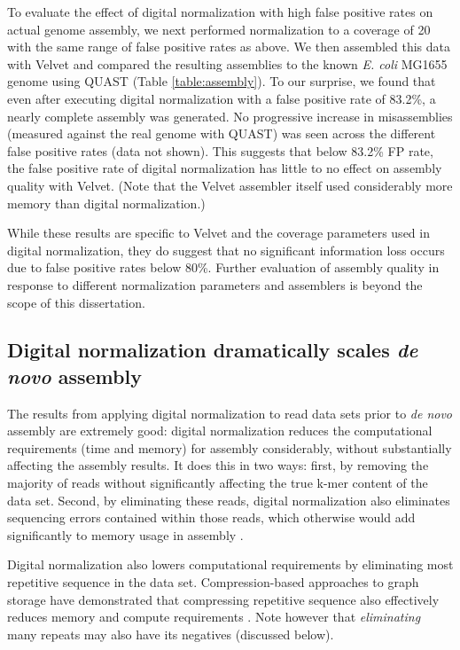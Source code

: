 To evaluate the effect of digital normalization with high false positive rates
on actual genome assembly, we next performed normalization to a coverage of 20
with the same range of false positive rates as above.  We then assembled this
data with Velvet \cite{Zerbino2008} and compared the resulting assemblies to
the known {\em E. coli} MG1655 genome using QUAST \cite{Gurevich2013} (Table \ref{table:assembly}).
To our surprise, we found that even after executing digital normalization with
a false positive rate of 83.2\%, a nearly complete assembly was generated.  No
progressive increase in misassemblies (measured against the real genome with
QUAST) was seen across the different false positive rates (data not shown).
This suggests that below 83.2\% FP rate, the false positive rate of digital
normalization has little to no effect on assembly quality with Velvet.  (Note
that the Velvet assembler itself used considerably more memory than digital
normalization.)


While these results are specific to Velvet and the coverage parameters used in
digital normalization, they do suggest that no significant information loss
occurs due to false positive rates below 80\%. Further evaluation of assembly
quality in response to different normalization parameters and assemblers is
beyond the scope of this dissertation.


\subsection{Digital normalization dramatically scales {\em de novo} assembly}

The results from applying digital normalization to read data sets prior to {\em
de novo} assembly are extremely good: digital normalization reduces the
computational requirements (time and memory) for assembly considerably, without
substantially affecting the assembly results.  It does this in two ways: first,
by removing the majority of reads without significantly affecting the true
k-mer content of the data set. Second, by eliminating these reads, digital
normalization also eliminates sequencing errors contained within those reads,
which otherwise would add significantly to memory usage in assembly
\cite{pubmed21245053}.

Digital normalization also lowers computational requirements by eliminating
most repetitive sequence in the data set. Compression-based approaches to graph
storage have demonstrated that compressing repetitive sequence also effectively
reduces memory and compute requirements \cite{pubmed22139935,pubmed22156294}.
Note however that {\em eliminating} many repeats may also have its negatives
(discussed below).

